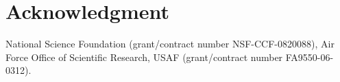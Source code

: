 \documentclass[10pt, conference, compsocconf]{IEEEtran}
\begin{document}
\section*{Acknowledgment}

National Science Foundation (grant/contract number NSF-CCF-0820088), Air Force Office of Scientific Research, USAF (grant/contract number FA9550-06-0312).  



%
%
%







\end{document}
